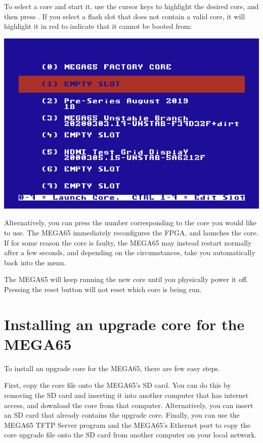 To select a core and start it, use the cursor keys to highlight the desired core, and then press
.  If you select a flash slot that does not
contain a valid core, it will highlight it in red to indicate that it
cannot be booted from:

\includegraphics[width=\linewidth]{images/ss-flashmenu-invalidslot.png}

Alternatively, you can press the number corresponding to the core you would
like to use. The MEGA65 immediately reconfigures the FPGA, and launches the core.  If for some reason
the core is faulty, the MEGA65 may instead restart normally after a few seconds, and depending on the
circumstances, take you automatically back into the menu.

The MEGA65 will keep running the new core until you physically power it off.  Pressing the reset button
will not reset which core is being run.

\section{Installing an upgrade core for the MEGA65}

To install an upgrade core for the MEGA65, there are few easy steps.

First, copy the core file onto the MEGA65's SD card.  You can do this by removing the SD card and inserting
it into another computer that has internet access, and download the core from that computer. Alternatively,
you can insert an SD card that already contains the upgrade core. Finally, you can use the MEGA65 TFTP Server
program and the MEGA65's Ethernet port to copy the core upgrade file onto the SD card from another computer
on your local network.

